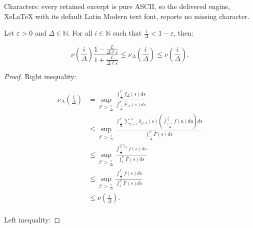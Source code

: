 \documentclass[10pt,a4paper]{amsart}
\newcommand{\N}{\mathbb{N}}
\renewcommand{\epsilon}{\varepsilon}
\renewcommand{\leq}{\leqslant}
\begin{document}
Characters: every retained excerpt is pure ASCII, so the delivered engine, XeLaTeX with its default Latin Modern text font, reports no missing character.
\begin{lemma}\label{lem:shifted}
    Let $\epsilon >0$ and $\Delta \in \N$. For all  $ i \in \mathbb{N}$ such that $\frac{i}{\Delta} < 1
    - \epsilon$, then:

    $$\nu(\frac{i}{\Delta}) \frac{1 -\frac{L}{\Delta \ell \epsilon}}{1 +
   \frac{L}{\Delta \ell \epsilon}}\leq \nu_\Delta(\frac{i}{\Delta}) \leq \nu(\frac{i}{\Delta}).$$
\end{lemma}

\begin{proof}
    
    Right  inequality:

    \begin{align*}
        \nu_\Delta(\frac{i}{\Delta}) 
        &= \sup_{t'>\frac{i}{\Delta}} \frac{\int_{\frac{i}{\Delta}}^{t'}
        f_\Delta(s)ds}{\int_{\frac{i}{\Delta}}^{t'} \bar{F}_\Delta(s) ds} \\
        &\leq \sup_{t'> \frac{i}{\Delta}} \frac{\int_{\frac{i}{\Delta}}^{t'}
        \sum_{j=1}^\Delta \delta_{j/\Delta}(s)  \left( \int_{\frac{j-1}{\Delta}}^{\frac{j}{\Delta}} f(u) du \right) ds}{\int_{\frac{i}{\Delta}}^{t'} \bar{F}(s) ds} \\
        &\leq \sup_{t'>\frac{i}{\Delta}} \frac{\int_{\frac{i}{\Delta}}^{\lfloor t' \rfloor_\Delta} f(s)
        ds}{\int_{t}^{t'} \bar{F}(s) ds} \\
        &\leq \sup_{t'>\frac{i}{\Delta}} \frac{\int_{\frac{i}{\Delta}}^{t'} f(s) ds}{\int_{t}^{t'}
        \bar{F}(s) ds} \\
        &\leq \nu(\frac{i}{\Delta}). \\
    \end{align*}


   Left  inequality:


\end{proof}
\end{document}
